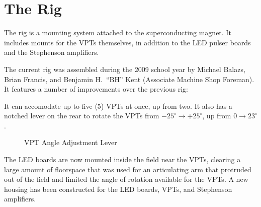 
\chapter{The Rig}
\label{sec:eq_rig}

The rig is a mounting system attached to the superconducting magnet.  It includes mounts for the VPTs themselves, in addition to the LED pulser boards and the Stephenson amplifiers.

The current rig was assembled during the 2009 school year by Michael Balazs, Brian Francis, and Benjamin H.\ ``BH'' Kent (Associate Machine Shop Foreman).  It features a number of improvements over the previous rig:

It can accomodate up to five (5) VPTs at once, up from two.  It also has a notched lever on the rear to rotate the VPTs from $-25^\circ \to +25^\circ$, up from $0 \to 23^\circ$.

\begin{figure}[hbp]
  \centering
  \caption{VPT Angle Adjustment Lever}
  \label{fig:eq_rig:angle}
\end{figure}

The LED boards are now mounted inside the field near the VPTs, clearing a large amount of floorspace that was used for an articulating arm that protruded out of the field and limited the angle of rotation available for the VPTs.  A new housing has been constructed for the LED boards, VPTs, and Stephenson amplifiers.



